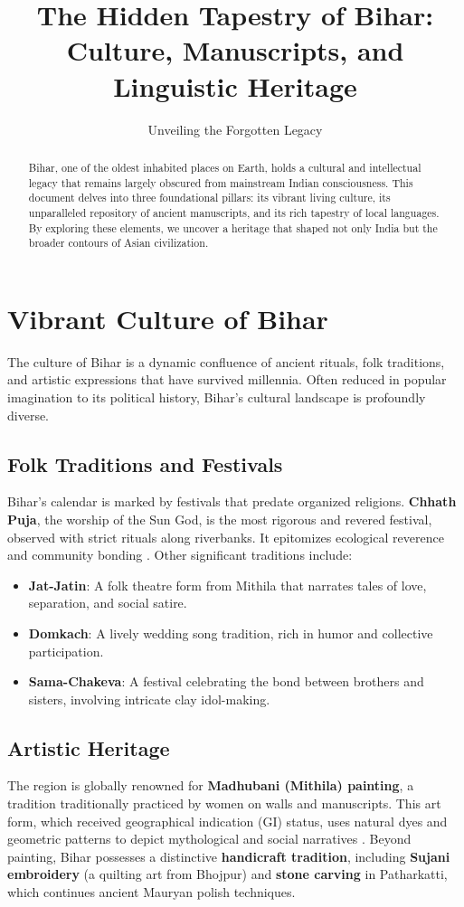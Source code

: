 \documentclass{article}
\title{\textbf{The Hidden Tapestry of Bihar:}\\Culture, Manuscripts, and Linguistic Heritage}
\author{Unveiling the Forgotten Legacy}
\date{}
\begin{document}
\maketitle

\begin{abstract}
\noindent
Bihar, one of the oldest inhabited places on Earth, holds a cultural and intellectual legacy that remains largely obscured from mainstream Indian consciousness. This document delves into three foundational pillars: its vibrant living culture, its unparalleled repository of ancient manuscripts, and its rich tapestry of local languages. By exploring these elements, we uncover a heritage that shaped not only India but the broader contours of Asian civilization.
\end{abstract}

\section{Vibrant Culture of Bihar}
The culture of Bihar is a dynamic confluence of ancient rituals, folk traditions, and artistic expressions that have survived millennia. Often reduced in popular imagination to its political history, Bihar’s cultural landscape is profoundly diverse.

\subsection{Folk Traditions and Festivals}
Bihar’s calendar is marked by festivals that predate organized religions. \textbf{Chhath Puja}, the worship of the Sun God, is the most rigorous and revered festival, observed with strict rituals along riverbanks. It epitomizes ecological reverence and community bonding \cite{singh2020chhath}. Other significant traditions include:
\begin{itemize}[leftmargin=*]
    \item \textbf{Jat-Jatin}: A folk theatre form from Mithila that narrates tales of love, separation, and social satire.
    \item \textbf{Domkach}: A lively wedding song tradition, rich in humor and collective participation.
    \item \textbf{Sama-Chakeva}: A festival celebrating the bond between brothers and sisters, involving intricate clay idol-making.
\end{itemize}

\subsection{Artistic Heritage}
The region is globally renowned for \textbf{Madhubani (Mithila) painting}, a tradition traditionally practiced by women on walls and manuscripts. This art form, which received geographical indication (GI) status, uses natural dyes and geometric patterns to depict mythological and social narratives \cite{jain1997madhubani}. Beyond painting, Bihar possesses a distinctive \textbf{handicraft tradition}, including \textbf{Sujani embroidery} (a quilting art from Bhojpur) and \textbf{stone carving} in Patharkatti, which continues ancient Mauryan polish techniques.
\end{document}
